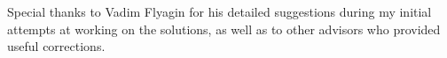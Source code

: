 \par{}
\vspace*{2ex}
\par\noindent Special thanks to Vadim Flyagin for his detailed suggestions during my initial attempts at working on the solutions, as well as to other advisors who provided useful corrections.
